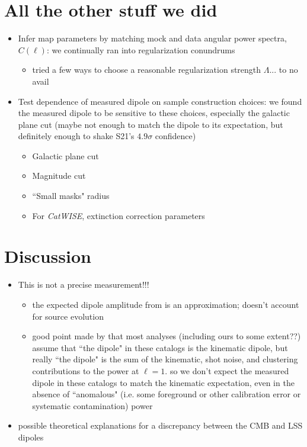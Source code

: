 \documentclass[modern]{aastex631}
\newcommand{\catwise}{\textsl{CatWISE}\xspace}
\begin{document}
\section{All the other stuff we did}
\label{sec:additional_tests}
\begin{itemize}
    \item Infer map parameters by matching mock and data angular power spectra, $C(\ell)$: we continually ran into regularization conundrums
    \begin{itemize}
        \item tried a few ways to choose a reasonable regularization strength $\Lambda$... to no avail
    \end{itemize}
    \item Test dependence of measured dipole on sample construction choices: we found the measured dipole to be sensitive to these choices, especially the galactic plane cut (maybe not enough to match the dipole to its expectation, but definitely enough to shake S21's $4.9\sigma$ confidence)
    \begin{itemize}
        \item Galactic plane cut
        \item Magnitude cut
        \item ``Small masks" radius
        \item For \catwise, extinction correction parameters
    \end{itemize}
\end{itemize}


\section{Discussion}
\label{sec:discussion}
\begin{itemize}
    \item This is not a precise measurement!!!
    \begin{itemize}
        \item the expected dipole amplitude from \citet{ellis_expected_1984} is an approximation; doesn't account for source evolution \citep{guandalin_theoretical_2022, dalang_kinematic_2022}
        \item good point made by \citet{cheng_is_2023} that most analyses (including ours to some extent??) assume that ``the dipole" in these catalogs is the kinematic dipole, but really ``the dipole" is the sum of the kinematic, shot noise, and clustering contributions to the power at $\ell=1$. so we don't expect the measured dipole in these catalogs to match the kinematic expectation, even in the absence of ``anomalous" (i.e. some foreground or other calibration error or systematic contamination) power
    \end{itemize}
    \item possible theoretical explanations for a discrepancy between the CMB and LSS dipoles \citep{han_qcd_2023, ghosh_probing_2023}
\end{itemize}
\end{document}
